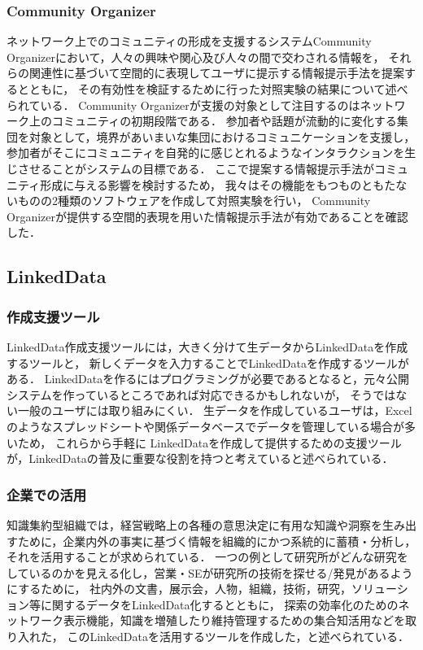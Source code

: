 \subsubsection{Community Organizer}
ネットワーク上でのコミュニティの形成を支援するシステムCommunity Organizer\cite{organizer}において，人々の興味や関心及び人々の間で交わされる情報を，
それらの関連性に基づいて空間的に表現してユーザに提示する情報提示手法を提案するとともに，
その有効性を検証するために行った対照実験の結果について述べられている．
Community Organizerが支援の対象として注目するのはネットワーク上のコミュニティの初期段階である．
参加者や話題が流動的に変化する集団を対象として，境界があいまいな集団におけるコミュニケーションを支援し，
参加者がそこにコミュニティを自発的に感じとれるようなインタラクションを生じさせることがシステムの目標である．
ここで提案する情報提示手法がコミュニティ形成に与える影響を検討するため，
我々はその機能をもつものともたないものの2種類のソフトウェアを作成して対照実験を行い，
Community Organizerが提供する空間的表現を用いた情報提示手法が有効であることを確認した．

\subsection{LinkedData}

\subsubsection{作成支援ツール}
LinkedData作成支援ツールには，大きく分けて生データからLinkedDataを作成するツールと，
新しくデータを入力することでLinkedDataを作成するツールがある\cite{tool}．
LinkedDataを作るにはプログラミングが必要であるとなると，元々公開システムを作っているところであれば対応できるかもしれないが，
そうではない一般のユーザには取り組みにくい．
生データを作成しているユーザは，Excelのようなスプレッドシートや関係データベースでデータを管理している場合が多いため，
これらから手軽に LinkedDataを作成して提供するための支援ツールが，LinkedDataの普及に重要な役割を持つと考えていると述べられている．

\subsubsection{企業での活用}
知識集約型組織では，経営戦略上の各種の意思決定に有用な知識や洞察を生み出すために，企業内外の事実に基づく情報を組織的にかつ系統的に蓄積・分析し，それを活用することが求められている．
一つの例として研究所がどんな研究をしているのかを見える化し，営業・SEが研究所の技術を探せる/発見があるようにするために，
社内外の文書，展示会，人物，組織，技術，研究，ソリューション等に関するデータをLinkedData化するとともに，
探索の効率化のためのネットワーク表示機能，知識を増殖したり維持管理するための集合知活用などを取り入れた，
このLinkedDataを活用するツールを作成した\cite{company}，と述べられている．

